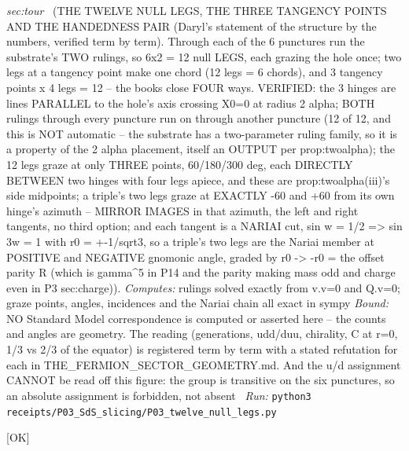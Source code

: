 \begin{description}
\textit{sec:tour} \ (THE TWELVE NULL LEGS, THE THREE TANGENCY POINTS AND THE HANDEDNESS PAIR (Daryl's statement of the structure by the numbers, verified term by term). Through each of the 6 punctures run the substrate's TWO rulings, so 6x2 = 12 null LEGS, each grazing the hole once; two legs at a tangency point make one chord (12 legs = 6 chords), and 3 tangency points x 4 legs = 12 -- the books close FOUR ways. VERIFIED: the 3 hinges are lines PARALLEL to the hole's axis crossing X0=0 at radius 2 alpha; BOTH rulings through every puncture run on through another puncture (12 of 12, and this is NOT automatic -- the substrate has a two-parameter ruling family, so it is a property of the 2 alpha placement, itself an OUTPUT per prop:twoalpha); the 12 legs graze at only THREE points, 60/180/300 deg, each DIRECTLY BETWEEN two hinges with four legs apiece, and these are prop:twoalpha(iii)'s side midpoints; a triple's two legs graze at EXACTLY -60 and +60 from its own hinge's azimuth -- MIRROR IMAGES in that azimuth, the left and right tangents, no third option; and each tangent is a NARIAI cut, sin w = 1/2 => sin 3w = 1 with r0 = +-1/sqrt3, so a triple's two legs are the Nariai member at POSITIVE and NEGATIVE gnomonic angle, graded by r0 -> -r0 = the offset parity R (which is gamma\textasciicircum{}5 in P14 and the parity making mass odd and charge even in P3 sec:charge)). 
\emph{Computes:} rulings solved exactly from v.v=0 and Q.v=0; graze points, angles, incidences and the Nariai chain all exact in sympy
 \emph{Bound:} NO Standard Model correspondence is computed or asserted here -- the counts and angles are geometry. The reading (generations, udd/duu, chirality, C at r=0, 1/3 vs 2/3 of the equator) is registered term by term with a stated refutation for each in THE\_FERMION\_SECTOR\_GEOMETRY.md. And the u/d assignment CANNOT be read off this figure: the group is transitive on the six punctures, so an absolute assignment is forbidden, not absent
\ \emph{Run:} \texttt{python3 receipts/P03\_SdS\_slicing/P03\_twelve\_null\_legs.py}
\item[\rcptlabel{P03_colour_spacelike_isospin_timelike}{P3R52}\textbf{P3R52}\quad\texttt{P03\_colour\_spacelike\_isospin\_timelike}]\hfill\textsf{[OK]}\\

\end{description}
